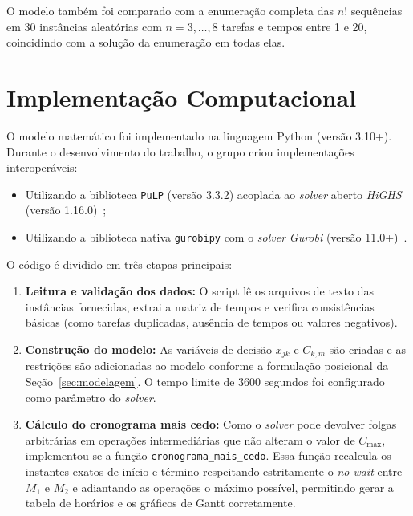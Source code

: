 \documentclass[11pt,a4paper]{article}
\begin{document}
O modelo também foi comparado com a enumeração completa das $n!$ sequências em 30 instâncias aleatórias com $n = 3, \dots, 8$ tarefas e tempos entre 1 e 20, coincidindo com a solução da enumeração em todas elas.


\section{Implementação Computacional}
\label{sec:implementacao}

O modelo matemático foi implementado na linguagem Python (versão 3.10+). Durante o desenvolvimento do trabalho, o grupo criou implementações interoperáveis:
\begin{itemize}
    \item Utilizando a biblioteca \texttt{PuLP} (versão 3.3.2) acoplada ao \textit{solver} aberto \textit{HiGHS} (versão 1.16.0)~\cite{huangfu2018};
    \item Utilizando a biblioteca nativa \texttt{gurobipy} com o \textit{solver} \textit{Gurobi} (versão 11.0+)~\cite{gurobi}.
\end{itemize}

O código é dividido em três etapas principais:
\begin{enumerate}
    \item \textbf{Leitura e validação dos dados:} O script lê os arquivos de texto das instâncias fornecidas, extrai a matriz de tempos e verifica consistências básicas (como tarefas duplicadas, ausência de tempos ou valores negativos).
    \item \textbf{Construção do modelo:} As variáveis de decisão $x_{jk}$ e $C_{k,m}$ são criadas e as restrições são adicionadas ao modelo conforme a formulação posicional da Seção~\ref{sec:modelagem}. O tempo limite de 3600 segundos foi configurado como parâmetro do \textit{solver}.
    \item \textbf{Cálculo do cronograma mais cedo:} Como o \textit{solver} pode devolver folgas arbitrárias em operações intermediárias que não alteram o valor de $C_{\max}$, implementou-se a função \texttt{cronograma\_mais\_cedo}. Essa função recalcula os instantes exatos de início e término respeitando estritamente o \textit{no-wait} entre $M_1$ e $M_2$ e adiantando as operações o máximo possível, permitindo gerar a tabela de horários e os gráficos de Gantt corretamente.
\end{enumerate}
\end{document}
